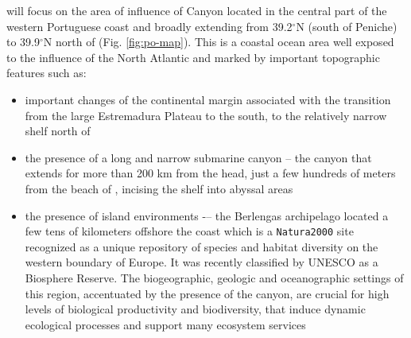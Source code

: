 \proj will focus on the area of influence of \naz Canyon located in
the central part of the western Portuguese coast and broadly extending
from 39.2$^{\circ}$N (south of Peniche) to 39.9$^{\circ}$N north of
\naz (Fig. \ref{fig:po-map}). This is a coastal ocean area well
exposed to the influence of the North Atlantic and marked by
important topographic features such as:

\begin{itemize}[noitemsep,topsep=0pt,parsep=0pt,partopsep=0pt]

\item important changes of the continental margin associated with the
  transition from the large Estremadura Plateau to the south, to the
  relatively narrow shelf north of \naz

\item the presence of a long and narrow submarine canyon – the \naz
  canyon that extends for more than 200 km from the head, just a few
  hundreds of meters from the beach of \naze, incising the shelf into
  abyssal areas

\item the presence of island environments -– the Berlengas archipelago
  located a few tens of kilometers offshore the coast which is a
  \texttt{Natura2000} site recognized as a unique repository of
  species and habitat diversity on the western boundary of Europe. It
  was recently classified by UNESCO as a Biosphere Reserve. The
  biogeographic, geologic and oceanographic settings of this region,
  accentuated by the presence of the \naz canyon, are crucial for high
  levels of biological productivity and biodiversity, that induce
  dynamic ecological processes and support many ecosystem services

\end{itemize}


